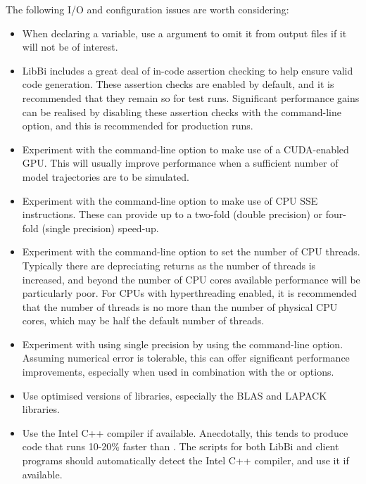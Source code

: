 The following I/O and configuration issues are worth considering:
\begin{itemize}
\item When declaring a variable, use a  argument to omit
  it from output files if it will not be of interest.

\item LibBi includes a great deal of in-code assertion
  checking to help ensure valid code
  generation. These assertion checks are enabled by default, and it is
  recommended that they remain so for test runs. Significant performance gains
  can be realised by disabling these assertion checks with the
   command-line option, and this is recommended for
  production runs.

\item {} Experiment with the  command-line
  option to make use of a CUDA-enabled GPU. This will usually
  improve performance when a sufficient number of model trajectories are to be
  simulated.

\item {} Experiment with the  command-line
  option to make use of CPU SSE instructions. These can
  provide up to a two-fold (double precision) or four-fold (single precision)
  speed-up.

\item {} Experiment with the
   command-line option to set the number of CPU
  threads. Typically there are depreciating returns as the number of threads
  is increased, and beyond the number of CPU cores available performance will
  be particularly poor. For CPUs with hyperthreading enabled, it is
  recommended that the number of threads is no more than the number of
  physical CPU cores, which may be half the default number of threads.

\item {} Experiment with using
  single precision by using the 
  command-line option. Assuming numerical error is tolerable, this can offer
  significant performance improvements, especially when used in combination
  with the  or  options.

\item Use optimised versions of libraries, especially the BLAS and
  LAPACK libraries.

\item Use the Intel C++ compiler if
  available. Anecdotally, this tends to produce code that runs 10-20\% faster
  than . The  scripts for both LibBi and
  client programs should automatically detect the Intel C++
  compiler, and use it if available.

\end{itemize}

